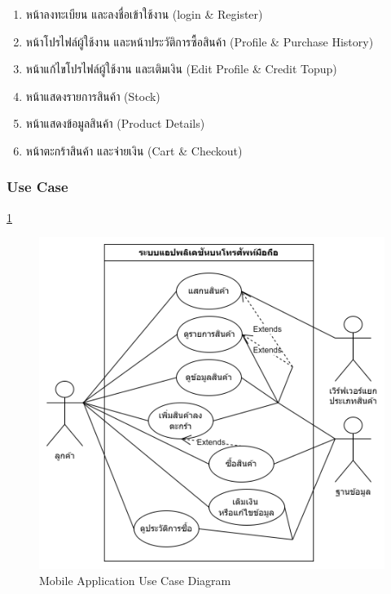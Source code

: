 \begin{enumerate}
  \item หน้าลงทะเบียน และลงชื่อเข้าใช้งาน (login \& Register)
  \item หน้าโปรไฟล์ผู้ใช้งาน และหน้าประวัติการซื้อสินค้า (Profile \& Purchase History)
  \item หน้าแก้ไขโปรไฟล์ผู้ใช้งาน และเติมเงิน (Edit Profile \& Credit Topup)
  \item หน้าแสดงรายการสินค้า (Stock)
  \item หน้าแสดงข้อมูลสินค้า (Product Details)
  \item หน้าตะกร้าสินค้า และจ่ายเงิน (Cart \& Checkout)

\end{enumerate}

\newpage
\subsubsection{Use Case}
\ref{fig:Mobile Application Use Case Diagram}

\begin{figure}[h]
  \begin{center}

    \includegraphics[scale=0.3]{pic/diagram/usecase-mobile.png}
  \end{center}

  \caption[Mobile Application Use Case Diagram]{Mobile Application Use Case Diagram}
  \label{fig:Mobile Application Use Case Diagram}
\end{figure}

